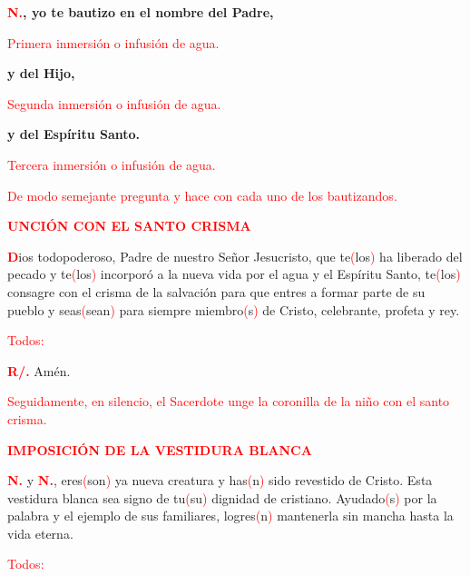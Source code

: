 \documentclass[12pt, letterpaper]{report}
\begin{document}
\noindent
\LARGE{ \bfseries \textcolor{red}{N.}, yo te bautizo en el nombre del Padre,}

\large {\textcolor{red}{Primera inmersi\'on o infusi\'on de agua.}}

\noindent
\LARGE {\bfseries y del Hijo,}

\large {\textcolor{red}{Segunda inmersi\'on o infusi\'on de agua.}}

\noindent
\LARGE {\bfseries y del Esp\'iritu Santo.}

\large {\textcolor{red}{Tercera inmersi\'on o infusi\'on de agua.}}

\large {\textcolor{red}{De modo semejante pregunta y hace con cada uno de los bautizandos.}}

\Large {\bfseries \textcolor{red}{UNCI\'ON CON EL SANTO CRISMA}} 

\lettrine[lines=1]{\bfseries \textcolor{red}{D}}{}\Large ios todopoderoso, Padre de nuestro Se\~nor Jesucristo, que te\textcolor{red}{(}los\textcolor{red}{)} ha liberado del pecado y te\textcolor{red}{(}los\textcolor{red}{)} incorpor\'o a la nueva vida por el agua y el Esp\'iritu Santo, te\textcolor{red}{(}los\textcolor{red}{)} consagre con el crisma de la salvaci\'on para que entres a formar parte de su pueblo y seas\textcolor{red}{(}sean\textcolor{red}{)} para siempre miembro\textcolor{red}{(}s\textcolor{red}{)} de Cristo, celebrante, profeta y rey.

\large {\textcolor{red}{Todos:}} 

\Large {\bfseries \textcolor{red}{R/.}} \hspace{0.5cm} Am\'en. 

\large {\textcolor{red}{Seguidamente, en silencio, el Sacerdote unge la coronilla de la ni\~no con el santo crisma.}}

\newpage

\Large {\bfseries \textcolor{red}{IMPOSICI\'ON DE LA VESTIDURA BLANCA}} 

\noindent
\Large {{\bfseries \textcolor{red}{N.}} y {\bfseries \textcolor{red}{N.}}, eres\textcolor{red}{(}son\textcolor{red}{)} ya nueva creatura y has\textcolor{red}{(}n\textcolor{red}{)} sido revestido de Cristo. Esta vestidura blanca sea signo de tu\textcolor{red}{(}su\textcolor{red}{)} dignidad de cristiano. Ayudado\textcolor{red}{(}s\textcolor{red}{)} por la palabra y el ejemplo de sus familiares, logres\textcolor{red}{(}n\textcolor{red}{)} mantenerla sin mancha hasta la vida eterna. }

\large {\textcolor{red}{Todos:}} 
\end{document}
